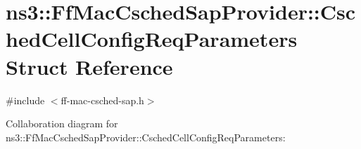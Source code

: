 \hypertarget{structns3_1_1FfMacCschedSapProvider_1_1CschedCellConfigReqParameters}{}\section{ns3\+:\+:Ff\+Mac\+Csched\+Sap\+Provider\+:\+:Csched\+Cell\+Config\+Req\+Parameters Struct Reference}
\label{structns3_1_1FfMacCschedSapProvider_1_1CschedCellConfigReqParameters}


{\ttfamily \#include $<$ff-\/mac-\/csched-\/sap.\+h$>$}



Collaboration diagram for ns3\+:\+:Ff\+Mac\+Csched\+Sap\+Provider\+:\+:Csched\+Cell\+Config\+Req\+Parameters\+:
